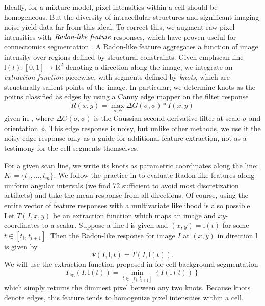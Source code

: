 \documentclass[english]{article}
\newcommand{\+}[1]{\ensuremath{\boldsymbol{\mathrm{#1}}}}
\begin{document}
Ideally, for a mixture model, pixel intensities within a cell should be homogeneous. But the diversity of intracellular structures and significant imaging noise yield data far from this ideal. To correct this, we augment raw pixel intensities with $\emph{Radon-like feature}$ responses, which have proven useful for connectomics segmentation \cite{Kumar2010}. A Radon-like feature aggregates a function of image intensity over regions defined by structural constraints. Given emph{scan line} $\+{l}(t) : [0, 1] \rightarrow \+{R}^2$ denoting a direction along the image, we integrate an \emph{extraction function} piecewise, with segments defined by \emph{knots}, which are structurally salient points of the image. In particular, we determine knots as the poitns classified as edges by using a Canny edge mapper on the filter response $$R(x,y) = \max_{\sigma, \phi} \Delta G(\sigma, \phi) \ast I(x,y) $$ given in \cite{Kumar2010}, where $\Delta G(\sigma, \phi)$ is the Gaussian second derivative filter at scale $\sigma$ and orientation $\phi$. This edge response is noisy, but unlike other methods, we use it the noisy edge response only as a guide for additional feature extraction, not as a testimony for the cell segments themselves.

For a given scan line, we write its knots as parametric coordinates along the line: $K_{\+l} = \{ t_1, \ldots, t_m \}$. We follow the practice in \cite{Kumar2010} to evaluate Radon-like features along uniform angular intervals (we find 72 sufficient to avoid most discretization artifacts) and take the mean response from all directions. Of course, using the entire vector of feature responses with a multivariate likelihood is also possible. Let $T(I, x, y)$ be an extraction function which maps an image and $xy$-coordinates to a scalar. Suppose a line $\+{l}$ is given and $(x, y) = \+{l}(t)$ for some $t \in [t_i, t_{i+1}]$. Then the Radon-like response for image $I$ at $(x, y)$ in direction $\+{l}$ is given by $$\Psi \left( I,\+{l},t \right) = T \left( I, \+{l}(t) \right).$$ We will use the extraction function proposed in \cite{Kumar2010} for cell background segmentation $$T_{\text{bg}}(I, \+{l}(t)) = \min_{t \in [t_i, t_{i+1}]} \left\{ I \left( \+{l}(t) \right) \right\}$$ which simply returns the dimmest pixel between any two knots. Because knots denote edges, this feature tends to homogenize pixel intensities within a cell.
\end{document}
